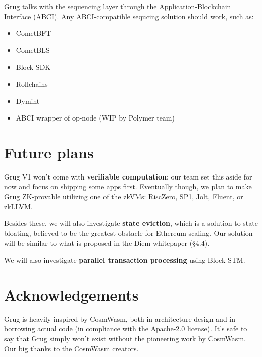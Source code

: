 \documentclass{article}
\begin{document}
Grug talks with the sequencing layer through the Application-Blockchain Interface (ABCI).\supercite{abci} Any ABCI-compatible sequcing solution should work, such as:

\begin{itemize}
  \item CometBFT\supercite{cometbft}
  \item CometBLS\supercite{cometbls}
  \item Block SDK\supercite{blocksdk}
  \item Rollchains\supercite{Rollchains}
  \item Dymint\supercite{dymint}
  \item ABCI wrapper of op-node\supercite{opnode} (WIP by Polymer team\supercite{polymer})
\end{itemize}

\section{Future plans}

Grug V1 won't come with \textbf{verifiable computation}; our team set this aside for now and focus on shipping some apps first. Eventually though, we plan to make Grug ZK-provable utilizing one of the zkVMs: RiscZero,\supercite{risczero} SP1,\supercite{sp1} Jolt,\supercite{jolt} Fluent,\supercite{fluent} or zkLLVM.\supercite{zkllvm}

Besides these, we will also investigate \textbf{state eviction}, which is a solution to state bloating, believed to be the greatest obstacle for Ethereum scaling.\supercite{ethereuminnumbers} Our solution will be similar to what is proposed in the Diem whitepaper (§4.4).\supercite{diemwhitepaper}

We will also investigate \textbf{parallel transaction processing} using Block-STM.\supercite{blockstm}

\section{Acknowledgements}

Grug is heavily inspired by CosmWasm,\supercite{cosmwasm} both in architecture design and in borrowing actual code (in compliance with the Apache-2.0 license). It's safe to say that Grug simply won't exist without the pioneering work by CosmWasm. Our big thanks to the CosmWasm creators.

\printbibliography
\end{document}
